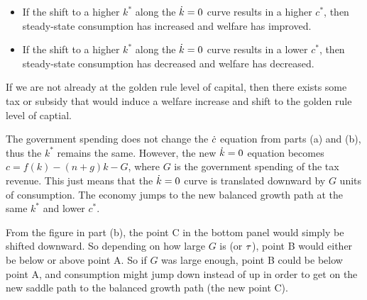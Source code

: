 \documentclass[12pt]{article}
\begin{document}
\begin{itemize}
    \item If the shift to a higher $k^*$ along the $\dot k=0$ curve results in a higher $c^*$, then steady-state consumption has increased and welfare has improved.
    \item If the shift to a higher $k^*$ along the $\dot k=0$ curve results in a lower $c^*$, then steady-state consumption has decreased and welfare has decreased.
\end{itemize}

If we are not already at the golden rule level of capital, then there exists some tax or subsidy that would induce a welfare increase and shift to the golden rule level of captial.




\newpage{}

The government spending does not change the $\dot c$ equation from parts (a) and (b), thus the $k^*$ remains the same. However, the new $\dot k=0$ equation becomes $c=f(k)-(n+g)k-G$, where $G$ is the government spending of the tax revenue. This just means that the $\dot k=0$ curve is translated downward by $G$ units of consumption. The economy jumps to the new balanced growth path at the same $k^*$ and lower $c^*$. 

From the figure in part (b), the point C in the bottom panel would simply be shifted downward. So depending on how large $G$ is (or $\tau$), point B would either be below or above point A. So if $G$ was large enough, point B could be below point A, and consumption might jump down instead of up in order to get on the new saddle path to the balanced growth path (the new point C).
\end{document}
